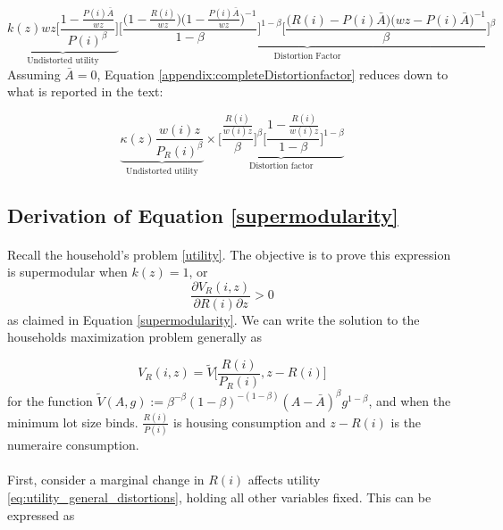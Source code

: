 \documentclass[12pt]{article}
\begin{document}
	\begin{equation}\label{appendix:completeDistortionfactor}
		\underbrace{k(z)wz\bigg[\frac{1-\frac{P(i)\bar{A}}{wz}}{P(i)^{\beta}}\bigg]}_{\text{Undistorted utility}} \underbrace{\bigg[\frac{\big(1 - \frac{R(i)}{wz}\big)\big(1 - \frac{P(i)\bar{A}}{wz}\big)^{-1}}{1-\beta}\bigg]^{1-\beta}\bigg[\frac{\big(R(i) - P(i)\bar{A}\big)\big(wz - P(i)\bar{A}\big)^{-1}}{\beta}\bigg]^{\beta}}_{\text{Distortion Factor}}
	\end{equation}
	Assuming $\bar{A} = 0$, Equation \eqref{appendix:completeDistortionfactor} reduces down to what is reported in the text: 
	
	\begin{equation*}
	\underbrace{\kappa(z)\frac{w(i)z}{P_{R}(i)^{\beta}}}_{\text{Undistorted utility}}  \times \underbrace{\biggl[\frac{\frac{R(i)}{w(i)z}}{\beta}\biggl]^{\beta}\biggl[\frac{1- \frac{R(i)}{w(i)z}}{1-\beta}\biggl]^{1 - \beta}}_{\text{Distortion factor}}
	\end{equation*}
	
	\clearpage
	\subsection{Derivation of Equation \eqref{supermodularity}}\label{derive_supermodularity} 
	
	\paragraph*{}
	Recall the household's problem \eqref{utility}. The objective is to prove this expression is supermodular when $k(z) = 1$, or $$\frac{\partial V_{R}(i, z)}{\partial R(i) \partial z } > 0$$ as claimed in Equation \eqref{supermodularity}. We can write the solution to the households maximization problem generally as 
	
	\begin{equation}\label{eq:utility_general_distortions}
		V_{R}(i, z) = \tilde{V}\bigg[\frac{R(i)}{P_{R}(i)}, z - R(i)\bigg]
	\end{equation}
	for the function $\tilde{V}(A, g) := \beta^{-\beta}(1-\beta)^{-(1-\beta)}(A - \bar{A})^{\beta}g^{1-\beta}$, and when the minimum lot size binds. $\frac{R(i)}{P(i)}$ is housing consumption and $z - R(i)$ is the numeraire consumption.
	
	\paragraph*{}
	First, consider a marginal change in $R(i)$ affects utility \eqref{eq:utility_general_distortions}, holding all other variables fixed. This can be expressed as
	
\end{document}
